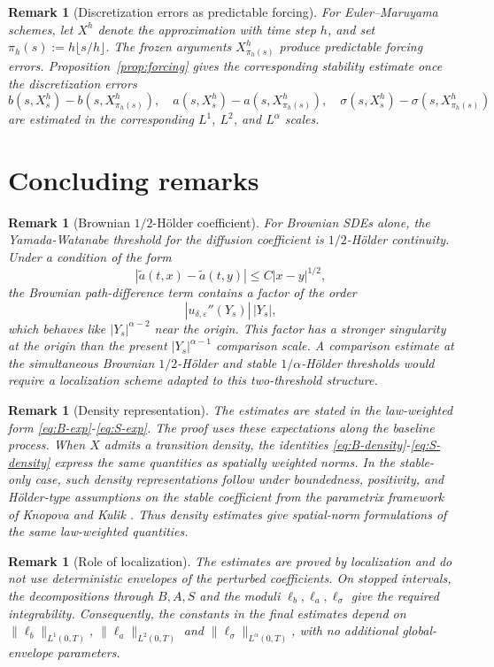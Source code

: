 \documentclass[11pt]{article}
\newtheorem{remark}[theorem]{Remark}
\newcommand{\1}{\mathbf{1}}
\newcommand{\wt}{\tilde}
\newcommand{\eps}{\varepsilon}
\begin{document}
\begin{remark}[Discretization errors as predictable forcing]
For Euler--Maruyama schemes, let $X^h$ denote the approximation with time step $h$, and set $\pi_h(s):=h\lfloor s/h\rfloor$. The frozen arguments $X_{\pi_h(s)}^{h}$ produce predictable forcing errors. Proposition~\ref{prop:forcing} gives the corresponding stability estimate once the discretization errors
\[
  b(s,X_s^h)-b(s,X_{\pi_h(s)}^h),\quad
  a(s,X_s^h)-a(s,X_{\pi_h(s)}^h),\quad
  \sigma(s,X_s^h)-\sigma(s,X_{\pi_h(s)}^h)
\]
are estimated in the corresponding $L^1$, $L^2$, and $L^\alpha$ scales.
\end{remark}

\section{Concluding remarks}
\label{sec:concluding}

\begin{remark}[Brownian $1/2$-H\"older coefficient]
For Brownian SDEs alone, the Yamada-Watanabe threshold for the diffusion coefficient is $1/2$-H\"older continuity. Under a condition of the form
\[
  |\wt a(t,x)-\wt a(t,y)|\le C|x-y|^{1/2},
\]
the Brownian path-difference term contains a factor of the order
\[
  |u_{\delta,\eps}''(Y_s)|\,|Y_s|,
\]
which behaves like $|Y_s|^{\alpha-2}$ near the origin.
This factor has a stronger singularity at the origin than the present $|Y_s|^{\alpha-1}$ comparison scale. A comparison estimate at the simultaneous Brownian $1/2$-H\"older and stable $1/\alpha$-H\"older thresholds would require a localization scheme adapted to this two-threshold structure.
\end{remark}

\begin{remark}[Density representation]
The estimates are stated in the law-weighted form \eqref{eq:B-exp}-\eqref{eq:S-exp}. The proof uses these expectations along the baseline process. When $X$ admits a transition density, the identities \eqref{eq:B-density}-\eqref{eq:S-density} express the same quantities as spatially weighted norms. In the stable-only case, such density representations follow under boundedness, positivity, and H\"older-type assumptions on the stable coefficient from the parametrix framework of Knopova and Kulik \cite{KnopovaKulik2018}. Thus density estimates give spatial-norm formulations of the same law-weighted quantities.
\end{remark}

\begin{remark}[Role of localization]
The estimates are proved by localization and do not use deterministic envelopes of the perturbed coefficients. On stopped intervals, the decompositions through $B,A,S$ and the moduli $\ell_b,\ell_a,\ell_\sigma$ give the required integrability. Consequently, the constants in the final estimates depend on $\|\ell_b\|_{L^1(0,T)}$, $\|\ell_a\|_{L^2(0,T)}$ and $\|\ell_\sigma\|_{L^\alpha(0,T)}$, with no additional global-envelope parameters.
\end{remark}
\end{document}
